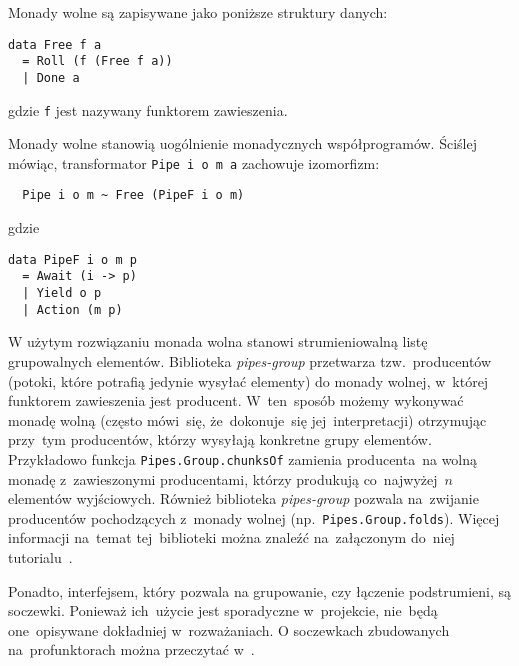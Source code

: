 \documentclass[../../praca.tex]{subfiles}
\begin{document}
Monady wolne są zapisywane jako poniższe struktury danych:
\begin{verbatim}
data Free f a
  = Roll (f (Free f a))
  | Done a
\end{verbatim}
gdzie \texttt{f} jest nazywany funktorem zawieszenia.

Monady wolne stanowią uogólnienie monadycznych współprogramów. Ściślej mówiąc,
transformator \texttt{Pipe i o m a} zachowuje izomorfizm:

\begin{verbatim}
  Pipe i o m ~ Free (PipeF i o m)
\end{verbatim}
gdzie
\begin{verbatim}
data PipeF i o m p
  = Await (i -> p)
  | Yield o p
  | Action (m p)
\end{verbatim}

W użytym rozwiązaniu monada wolna stanowi strumieniowalną listę grupowalnych
elementów. Biblioteka \emph{pipes-group} przetwarza tzw.~producentów
(potoki, które potrafią jedynie wysyłać elementy) do monady wolnej,
w~której funktorem zawieszenia jest producent. W~ten~sposób możemy 
wykonywać monadę wolną (często mówi~się, że~dokonuje~się jej~interpretacji)
otrzymując przy~tym producentów, którzy wysyłają konkretne grupy elementów.
Przykładowo funkcja \texttt{Pipes.Group.chunksOf} zamienia producenta~na wolną monadę
z~zawieszonymi producentami, którzy produkują co~najwyżej~\( n \) elementów
wyjściowych.
Również biblioteka \emph{pipes-group} pozwala na~zwijanie producentów
pochodzących z~monady wolnej (np.~\texttt{Pipes.Group.folds}).
Więcej informacji na~temat tej~biblioteki można znaleźć na~załączonym
do~niej tutorialu~\cite{Hackage:Pipes-Groups-Tut}.

Ponadto, interfejsem, który pozwala na grupowanie, czy łączenie podstrumieni,
są soczewki. Ponieważ ich~użycie jest sporadyczne w~projekcie, nie~będą
one~opisywane dokładniej w~rozważaniach. O soczewkach zbudowanych
na~profunktorach można przeczytać w~\cite{Pickering_2017}.
\end{document}
